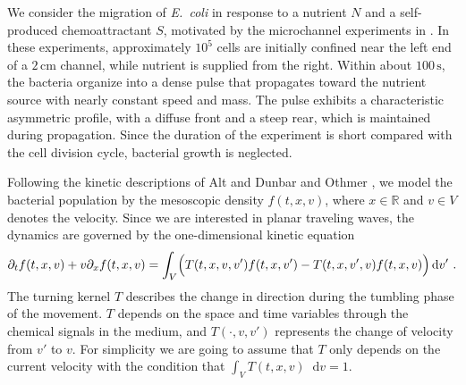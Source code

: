 \documentclass[11pt,twoside]{article}
\numberwithin{equation}{section}
\newcommand*\diff{\mathop{}\!\mathrm{d}}
\theoremstyle{plain}
\theoremstyle{nonumberplain}
\begin{document}
We consider the migration of \textit{E.~coli} in response to a nutrient $N$ and a self-produced chemoattractant $S$, motivated by the microchannel experiments in \cite{saragosti2010mathematical}. In these experiments, approximately $10^5$ cells are initially confined near the left end of a $2\,\mathrm{cm}$ channel, while nutrient is supplied from the right. Within about $100\,\mathrm{s}$, the bacteria organize into a dense pulse that propagates toward the nutrient source with nearly constant speed and mass. The pulse exhibits a characteristic asymmetric profile, with a diffuse front and a steep rear, which is maintained during propagation. Since the duration of the experiment is short compared with the cell division cycle, bacterial growth is neglected.





Following the kinetic descriptions of Alt \cite{alt1980biased} and Dunbar and Othmer
\cite{othmer1988models}, we model the bacterial population by the mesoscopic density
$f(t,x,v)$, where $x \in \mathbb{R}$ and $v \in V$ denotes the velocity. Since we are
interested in planar traveling waves, the dynamics are governed by the one-dimensional
kinetic equation
\begin{equation}
    \partial_t f(t,x,v)+{v}\partial_x f(t,x,v)= \int_{V}\Bigl(T(t,x,v,v')f(t,x,v')-  T(t,x,{v}',v)f(t,x,v)\Bigr)\diff v'\ .\label{eq: main kinetic}
\end{equation}
 The turning kernel $T$ describes the change in direction during the tumbling phase of the movement. $T$ depends on the space and time variables through the chemical signals in the medium,  and $T(\cdot, v,v')$ represents the change of velocity from $v'$ to $v$. For simplicity we are going to assume that $T$ only depends on the current velocity with the condition that $\int_VT(t,x,v)\diff v=1$.
 
\end{document}
